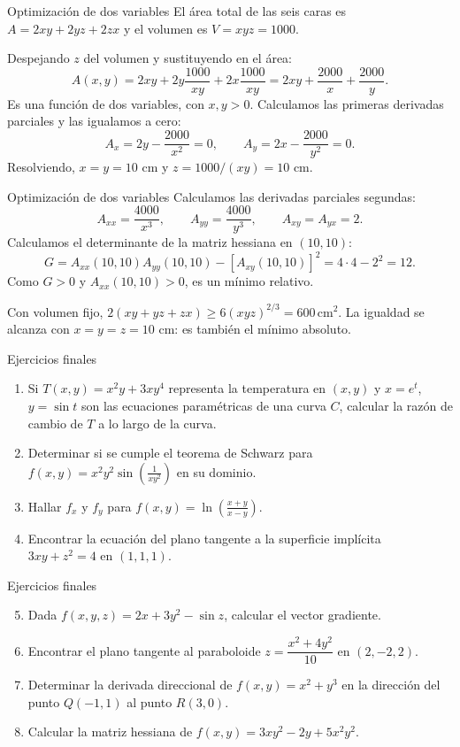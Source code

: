 \documentclass[main.tex]{subfiles}
\begin{document}
\begin{frame}{Optimización de dos variables}
\small El área total de las seis caras es $A=2xy+2yz+2zx$ y el volumen es $V=xyz=1000$.
\medskip

Despejando $z$ del volumen y sustituyendo en el área:
\[A(x,y)=2xy+2y\frac{1000}{xy}+2x\frac{1000}{xy}=2xy+\frac{2000}x+\frac{2000}y.\]
Es una función de dos variables, con $x,y>0$. Calculamos las primeras derivadas parciales y las igualamos a cero:
\[A_x=2y-\frac{2000}{x^2}=0,\qquad A_y=2x-\frac{2000}{y^2}=0.\]
Resolviendo, $x=y=10$ cm y $z=1000/(xy)=10$ cm.
\end{frame}
\begin{frame}{Optimización de dos variables}
\small Calculamos las derivadas parciales segundas:
\[A_{xx}=\frac{4000}{x^3},\qquad A_{yy}=\frac{4000}{y^3},\qquad A_{xy}=A_{yx}=2.\]
Calculamos el determinante de la matriz hessiana en $(10,10)$:
\[G=A_{xx}(10,10)A_{yy}(10,10)-[A_{xy}(10,10)]^2=4\cdot4-2^2=12.\]
Como $G>0$ y $A_{xx}(10,10)>0$, es un mínimo relativo.
\medskip

Con volumen fijo, $2(xy+yz+zx)\ge6(xyz)^{2/3}=600\,\mathrm{cm}^2$. La igualdad se alcanza con $x=y=z=10$ cm: es también el mínimo absoluto.
\end{frame}
\begin{frame}{Ejercicios finales}
\small\begin{enumerate}
\item Si $T(x,y)=x^2y+3xy^4$ representa la temperatura en $(x,y)$ y $x=e^t$, $y=\sin t$ son las ecuaciones paramétricas de una curva $C$, calcular la razón de cambio de $T$ a lo largo de la curva.
\item Determinar si se cumple el teorema de Schwarz para $f(x,y)=x^2y^2\sin\!\left(\frac1{xy^2}\right)$ en su dominio.
\item Hallar $f_x$ y $f_y$ para $f(x,y)=\ln\!\left(\frac{x+y}{x-y}\right)$.
\item Encontrar la ecuación del plano tangente a la superficie implícita $3xy+z^2=4$ en $(1,1,1)$.
\end{enumerate}
\end{frame}
\begin{frame}{Ejercicios finales}
\small\begin{enumerate}\setcounter{enumi}{4}
\item Dada $f(x,y,z)=2x+3y^2-\sin z$, calcular el vector gradiente.
\item Encontrar el plano tangente al paraboloide $z=\dfrac{x^2+4y^2}{10}$ en $(2,-2,2)$.
\item Determinar la derivada direccional de $f(x,y)=x^2+y^3$ en la dirección del punto $Q(-1,1)$ al punto $R(3,0)$.
\item Calcular la matriz hessiana de $f(x,y)=3xy^2-2y+5x^2y^2$.
\end{enumerate}
\end{frame}
\end{document}
